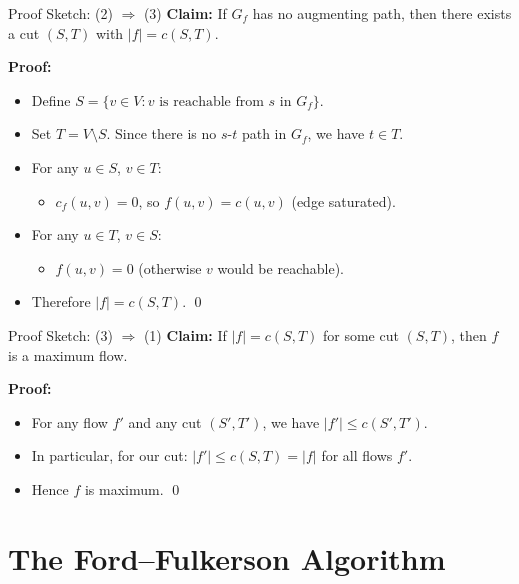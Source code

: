 \documentclass[aspectratio=169]{beamer}
\begin{document}
\begin{frame}{Proof Sketch: (2) $\Rightarrow$ (3)}
  \textbf{Claim:} If $G_f$ has no augmenting path, then there exists a cut
  $(S,T)$ with $|f| = c(S,T)$.

  \vspace{1em}
  \textbf{Proof:}
  \begin{itemize}
    \item Define $S = \{v \in V : v \text{ is reachable from } s \text{ in } G_f\}$.
    \item Set $T = V \setminus S$. Since there is no $s$-$t$ path in $G_f$, we
          have $t \in T$.
    \item For any $u \in S$, $v \in T$:
          \begin{itemize}
            \item $c_f(u,v) = 0$, so $f(u,v) = c(u,v)$ (edge saturated).
          \end{itemize}
    \item For any $u \in T$, $v \in S$:
          \begin{itemize}
            \item $f(u,v) = 0$ (otherwise $v$ would be reachable).
          \end{itemize}
    \item Therefore $|f| = c(S,T)$. \qed
  \end{itemize}
\end{frame}

\begin{frame}{Proof Sketch: (3) $\Rightarrow$ (1)}
  \textbf{Claim:} If $|f| = c(S,T)$ for some cut $(S,T)$, then $f$ is a
  maximum flow.

  \vspace{1em}
  \textbf{Proof:}
  \begin{itemize}
    \item For any flow $f'$ and any cut $(S', T')$, we have $|f'| \leq c(S',T')$.
    \item In particular, for our cut: $|f'| \leq c(S,T) = |f|$ for all flows $f'$.
    \item Hence $f$ is maximum. \qed
  \end{itemize}
\end{frame}

\section{The Ford--Fulkerson Algorithm}
\end{document}

